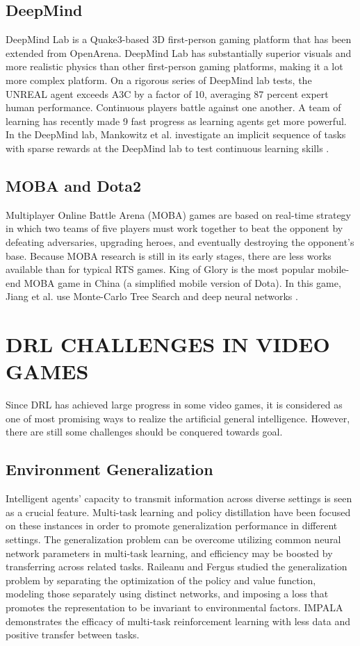 \documentclass{article}
\begin{document}
\subsection{DeepMind}
DeepMind Lab is a Quake3-based 3D first-person gaming
platform that has been extended from OpenArena. DeepMind
Lab has substantially superior visuals and more realistic
physics than other first-person gaming platforms, making it a lot more complex platform. On a rigorous series of DeepMind lab tests, the UNREAL agent exceeds A3C by a factor of 10, averaging 87 percent expert human performance. Continuous players battle against one another. A team of learning has recently made 9 fast progress as learning agents get more powerful. In the DeepMind lab, Mankowitz et al. investigate an implicit sequence of tasks with sparse rewards at the DeepMind lab to test continuous learning skills \cite{mankowitz2018unicorn}. 
\subsection{MOBA and Dota2}
Multiplayer Online Battle Arena (MOBA) games are based on
real-time strategy in which two teams of five players must work together to beat the opponent by defeating adversaries, upgrading heroes, and eventually destroying the opponent's base. Because MOBA research is still in its early stages, there are less works available than for typical RTS games. King of Glory is the most popular mobile-end MOBA game in China (a simplified mobile version of Dota). In this game, Jiang et al. use Monte-Carlo Tree Search and deep neural networks \cite{jiang2018feedback}. 


\section{DRL CHALLENGES IN VIDEO GAMES}
Since DRL has achieved large progress in some video games, it is considered as one of most promising ways to
realize the artificial general intelligence. However, there are still some challenges should be conquered towards goal.

\subsection{Environment Generalization}
Intelligent agents' capacity to transmit information
across diverse settings is seen as a crucial feature. Multi-task
learning and policy distillation have been focused on these
instances in order to promote generalization performance in
different settings. The generalization problem can be
overcome utilizing common neural network parameters in
multi-task learning, and efficiency may be boosted by
transferring across related tasks. Raileanu and Fergus \cite{raileanu2021decoupling} studied the generalization problem by separating the
optimization of the policy and value function, modeling those
separately using distinct networks, and imposing a loss that
promotes the representation to be invariant to environmental
factors. IMPALA \cite{espie2005torcs} demonstrates the efficacy of multi-task
reinforcement learning with less data and positive transfer
between tasks. 
\end{document}
